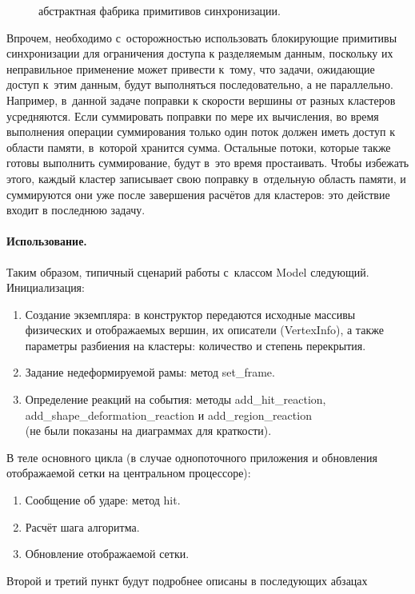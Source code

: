 \documentclass[a4paper, 14pt, titlepage]{extarticle}
\newcommand{\includefigure}[3][]{
    \begin{figure}[!htb]
      \center{\texttt{[image: \#2]}}
      \caption{#3} \label{fig:#2}
    \end{figure}
  }
\begin{document}
        \includefigure{parallel}{абстрактная фабрика примитивов синхронизации.}

        Впрочем, необходимо с~осторожностью использовать блокирующие примитивы синхронизации для
        ограничения доступа к разделяемым данным, поскольку их неправильное применение может
        привести к~тому, что задачи, ожидающие доступ к~этим данным, будут выполняться
        последовательно, а не параллельно.  Например, в~данной задаче поправки к скорости вершины от
        разных кластеров усредняются. Если суммировать поправки по мере их вычисления, во время
        выполнения операции суммирования только один поток должен иметь доступ к области памяти,
        в~которой хранится сумма. Остальные потоки, которые также готовы выполнить суммирование,
        будут в~это время простаивать. Чтобы избежать этого, каждый кластер записывает свою поправку
        в~отдельную область памяти, и суммируются они уже после завершения расчётов для кластеров:
        это действие входит в последнюю задачу.

        \paragraph{Использование.}
        Таким образом, типичный сценарий работы с~классом Model следующий. Инициализация:
        \begin{enumerate}
          \item Создание экземпляра: в конструктор передаются исходные массивы физических и
          отображаемых вершин, их описатели (VertexInfo), а также параметры разбиения на кластеры:
          количество и степень перекрытия.
          \item Задание недеформируемой рамы: метод set\_frame.
          \item Определение реакций на события: методы add\_hit\_reaction,\\
          add\_shape\_deformation\_reaction и add\_region\_reaction\\
          (не были показаны на диаграммах для краткости).
        \end{enumerate}
        В теле основного цикла (в случае однопоточного приложения и обновления отображаемой сетки на
        центральном процессоре):
        \begin{enumerate}
          \item Сообщение об ударе: метод hit.
          \item Расчёт шага алгоритма.
          \item Обновление отображаемой сетки.
        \end{enumerate}
        Второй и третий пункт будут подробнее описаны в последующих абзацах
\end{document}
